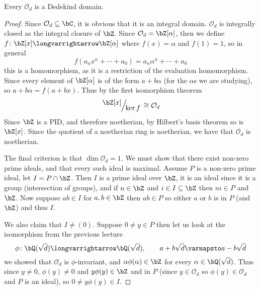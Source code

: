 \documentclass[10pt]{article}
\let\longto=\longvarrightarrow
\def\mO{\mathcal O}
\begin{document}


\bigskip

\begin{prop*}

    Every $\mO_d$ is a Dedekind domain.

\end{prop*}

\begin{proof}

    Since $\mO_d\subseteq\bC$, it is obvious that it is an integral domain.
    $\mO_d$ is integrally closed as the integral closure of $\bZ$.
    Since $\mO_d=\bZ[\alpha]$, then we define $f\colon\bZ[x]\longto\bZ[\alpha]$ where $f(x)=\alpha$ and $f(1)=1$, so in general
    \[ f(a_nx^n+\cdots+a_0) = a_n\alpha^n+\cdots+a_0 \]
    this is a homomorphism, as it is a restriction of the evaluation homomorphism.
    Since every element of $\bZ[\alpha]$ is of the form $a+b\alpha$ (for the $\alpha$s we are studying), so $a+b\alpha=f(a+bx)$.
    Thus by the first isomorphism theorem
    \[ \slfrac{\bZ[x]}{\ker f} \cong \mO_d \]
    Since $\bZ$ is a PID, and therefore noetherian, by Hilbert's basis theorem so is $\bZ[x]$.
    Since the quotient of a noetherian ring is noetherian, we have that $\mO_d$ is noetherian.

    The final criterion is that $\dim\mO_d=1$.
    We must show that there exist non-zero prime ideals, and that every such ideal is maximal.
    Assume $P$ is a non-zero prime ideal, let $I=P\cap\bZ$.
    Then $I$ is a prime ideal over $\bZ$, it is an ideal since it is a group (intersection of groups), and if $n\in\bZ$ and $i\in I\subseteq\bZ$ then $ni\in P$ and $\bZ$.
    Now suppose $ab\in I$ for $a,b\in\bZ$ then $ab\in P$ so either $a$ or $b$ is in $P$ (and $\bZ$) and thus $I$.

    We also claim that $I\neq(0)$.
    Suppose $0\neq y\in P$ then let us look at the isomorphism from the previous lecture
    \[ \phi\colon\bQ(\sqrt d)\longto\bQ(\sqrt d),\qquad a+b\sqrt d\varmapsto a-b\sqrt d \]
    we showed that $\mO_d$ is $\phi$-invariant, and $\alpha\phi(\alpha)\in\bZ$ for every $\alpha\in\bQ(\sqrt d)$.
    Thus since $y\neq0$, $\phi(y)\neq0$ and $y\phi(y)\in\bZ$ and in $P$ (since $y\in\mO_d$ so $\phi(y)\in\mO_d$ and $P$ is an ideal), so $0\neq y\phi(y)\in I$.


\end{proof}
\end{document}
